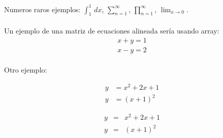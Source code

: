 \documentclass{article}
\begin{document}
\noindent Numeros raros ejemplos:
$\int_{1}^{1}  \,dx$,
$\sum_{n = 1}^{\infty}$,
$\prod_{n = 1}^{\infty}$,
$\lim_{x \to 0}$.
\\ \\

\noindent Un ejemplo de una matriz de ecuaciones alineada sería usando array:
\[
\begin{array}{c}
    x + y = 1 \\
    x - y = 2
\end{array}
\]
\\
Otro ejemplo:

\begin{eqnarray}
    y &= x^2 + 2x + 1 \\
    y &= (x + 1)^2 \nonumber
\end{eqnarray}

\begin{eqnarray}
    y &=& x^2 + 2x + 1 \\
    y &=& (x + 1)^2 \nonumber
\end{eqnarray}
\end{document}
